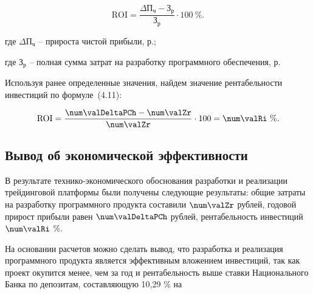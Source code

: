 \begin{equation}
  \label{eq:econ:Ri}
  \text{ROI} = \frac{\Delta \text{П}_\text{ч} - \text{З}_\text{р}}{\text{З}_\text{р}}
    \cdot 100 \ \%.
\end{equation}
\begin{explanationx}
  \item[где] $ \Delta \text{П}_\text{ч} $ -- прироста чистой прибыли, р.;
  \item[где] $ \text{З}_\text{р} $ -- полная сумма затрат на разработку программного обеспечения, р.
\end{explanationx}


Используя ранее определенные значения, найдем значение рентабельности инвестиций по формуле~(4.11):

\begin{equation}
  \label{eq:econ:RiCalc}
  \text{ROI} = \frac{\num\valDeltaPCh - \num\valZr}{\num\valZr}
    \cdot 100 = \num\valRi \ \%.
\end{equation}

\fixTableSectionSpace

\subsection{Вывод об экономической эффективности}

В результате технико-экономического обоснования разработки и
реализации трейдинговой платформы были получены следующие результаты:
общие затраты на разработку программного продукта составили $ \num\valZr $ рублей,
годовой прирост прибыли равен $ \num\valDeltaPCh $ рублей,
рентабельность инвестиций $ \num\valRi $ \%.

На основании расчетов можно сделать вывод, что разработка и реализация программного продукта является
эффективным вложением инвестиций, так как проект окупится менее, чем за год и рентабельность выше ставки Национального Банка по депозитам, составляющую 10,29 \% на \econCalcDate



